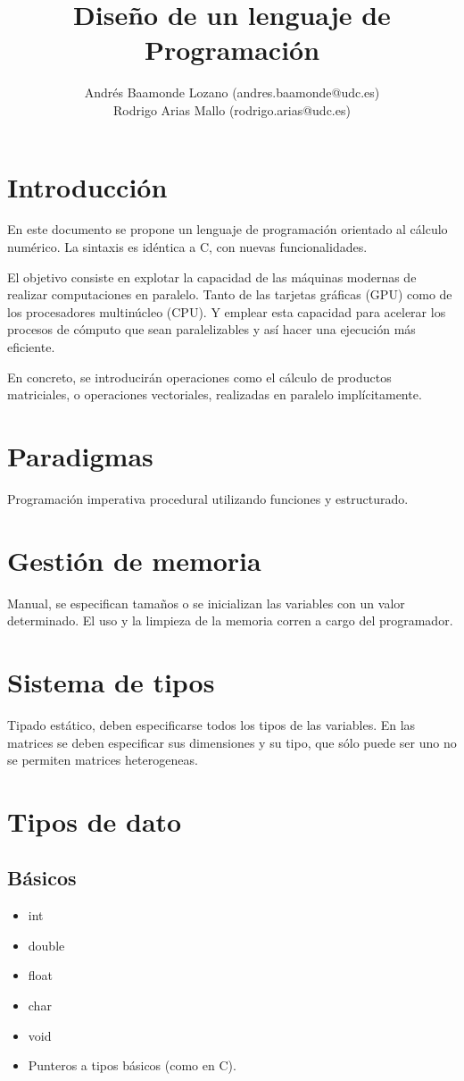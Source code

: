\documentclass[12pt,a4paper]{article}
\title{Diseño de un lenguaje de Programación}
\author{Andrés Baamonde Lozano (andres.baamonde@udc.es)\\
	Rodrigo Arias Mallo (rodrigo.arias@udc.es)}
\begin{document}
\maketitle

\clearpage 

\tableofcontents

\clearpage 



\section{Introducción}
En este documento se propone un lenguaje de programación orientado al cálculo 
numérico. La sintaxis es idéntica a C, con nuevas funcionalidades.

El objetivo consiste en explotar la capacidad de las máquinas modernas de 
realizar computaciones en paralelo. Tanto de las tarjetas gráficas (GPU) como de 
los procesadores multinúcleo (CPU). Y emplear esta capacidad para acelerar los 
procesos de cómputo que sean paralelizables y así hacer una ejecución más 
eficiente.

En concreto, se introducirán operaciones como el cálculo de productos 
matriciales, o operaciones vectoriales, realizadas en paralelo implícitamente.
\section{Paradigmas}
Programación imperativa procedural utilizando funciones y estructurado.
\section{Gestión de memoria}
Manual, se especifican tamaños o se inicializan las variables con un valor
determinado. El uso y la limpieza de la memoria corren a cargo del programador.
\section{Sistema de tipos}
Tipado estático, deben especificarse todos los tipos de las variables. En las
matrices se deben especificar sus dimensiones y su tipo, que sólo puede ser uno
no se permiten matrices heterogeneas. 
\section{Tipos de dato}
\subsection{Básicos}
\begin{itemize}
\item int
\item double
\item float
\item char
\item void
\item Punteros a tipos básicos (como en C).
\end{itemize}
\end{document}
